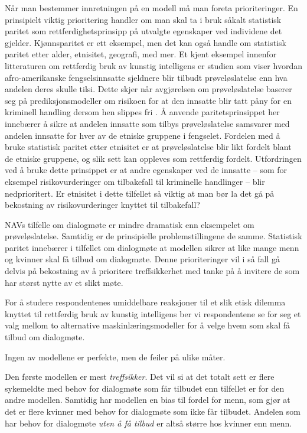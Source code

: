 \documentclass[
  12pt,
  a4paper, 12pt]{article}
\begin{document}
Når man bestemmer innretningen på en modell må man foreta prioriteringer.
En prinsipielt viktig prioritering handler om man skal ta i bruk såkalt statistisk paritet som rettferdighetsprinsipp på utvalgte egenskaper ved individene det gjelder.
Kjønnsparitet er ett eksempel, men det kan også handle om statistisk paritet etter alder, etnisitet, geografi, med mer.
Et kjent eksempel innenfor litteraturen om rettferdig bruk av kunstig intelligens er studien som viser hvordan afro-amerikanske fengselsinnsatte sjeldnere blir tilbudt prøveløslatelse enn hva andelen deres skulle tilsi.
Dette skjer når avgjørelsen om prøveløslatelse baserer seg på prediksjonsmodeller om risikoen for at den innsatte blir tatt påny for en kriminell handling dersom hen slippes fri \citep{chouldechova2017fair}.
Å anvende paritetsprinsippet her innebærer å sikre at andelen innsatte som tilbys prøveløslatelse samsvarer med andelen innsatte for hver av de etniske gruppene i fengselet.
Fordelen med å bruke statistisk paritet etter etnisitet er at prøveløslatelse blir likt fordelt blant de etniske gruppene, og slik sett kan oppleves som rettferdig fordelt.
Utfordringen ved å bruke dette prinsippet er at andre egenskaper ved de innsatte -- som for eksempel risikovurderinger om tilbakefall til kriminelle handlinger -- blir nedprioritert.
Er etnisitet i dette tilfellet så viktig at man bør la det gå på bekostning av risikovurderinger knyttet til tilbakefall?

NAVs tilfelle om dialogmøte er mindre dramatisk enn eksempelet om prøveløslatelse.
Samtidig er de prinsipielle problemstillingene de samme.
Statistisk paritet innebærer i tilfellet om dialogmøte at modellen sikrer at like mange menn og kvinner skal få tilbud om dialogmøte.
Denne prioriteringer vil i så fall gå delvis på bekostning av å prioritere treffsikkerhet med tanke på å invitere de som har størst nytte av et slikt møte.

For å studere respondentenes umiddelbare reaksjoner til et slik etisk dilemma knyttet til rettferdig bruk av kunstig intelligens ber vi respondentene se for seg et valg mellom to alternative maskinlæringsmodeller for å velge hvem som skal få tilbud om dialogmøte.

Ingen av modellene er perfekte, men de feiler på ulike måter.

Den første modellen er mest \emph{treffsikker}.
Det vil si at det totalt sett er flere sykemeldte med behov for dialogmøte som får tilbudet enn tilfellet er for den andre modellen.
Samtidig har modellen en bias til fordel for menn, som gjør at det er flere kvinner med behov for dialogmøte som ikke får tilbudet.
Andelen som har behov for dialogmøte \emph{uten å få tilbud} er altså større hos kvinner enn menn.
\end{document}
